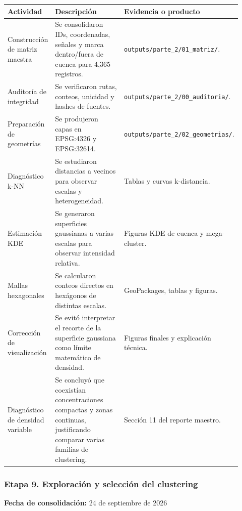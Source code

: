 \documentclass[
  spanish,
]{article}
\newcounter{none} %
\begin{document}
{\def\LTcaptype{none} %
\begin{longtable}[]{@{}p{0.20\linewidth}p{0.44\linewidth}p{0.28\linewidth}@{}}
\toprule\noalign{}
Actividad & Descripción & Evidencia o producto \\
\midrule\noalign{}
\endhead
\bottomrule\noalign{}
\endlastfoot
Construcción de matriz maestra & Se consolidaron IDs, coordenadas,
señales y marca dentro/fuera de cuenca para 4,365 registros. &
\texttt{outputs/parte\_2/01\_matriz/}. \\
Auditoría de integridad & Se verificaron rutas, conteos, unicidad y
hashes de fuentes. & \texttt{outputs/parte\_2/00\_auditoria/}. \\
Preparación de geometrías & Se produjeron capas en EPSG:4326 y
EPSG:32614. & \texttt{outputs/parte\_2/02\_geometrias/}. \\
Diagnóstico k-NN & Se estudiaron distancias a vecinos para observar
escalas y heterogeneidad. & Tablas y curvas k-distancia. \\
Estimación KDE & Se generaron superficies gaussianas a varias escalas
para observar intensidad relativa. & Figuras KDE de cuenca y
mega-cluster. \\
Mallas hexagonales & Se calcularon conteos directos en hexágonos de
distintas escalas. & GeoPackages, tablas y figuras. \\
Corrección de visualización & Se evitó interpretar el recorte de la
superficie gaussiana como límite matemático de densidad. & Figuras
finales y explicación técnica. \\
Diagnóstico de densidad variable & Se concluyó que coexistían
concentraciones compactas y zonas continuas, justificando comparar
varias familias de clustering. & Sección 11 del reporte maestro. \\
\end{longtable}
}

\subsubsection{Etapa 9. Exploración y selección del
clustering}\label{etapa-9-exploraciuxf3n-y-selecciuxf3n-del-clustering}

\textbf{Fecha de consolidación:} 24 de septiembre de 2026
\end{document}
